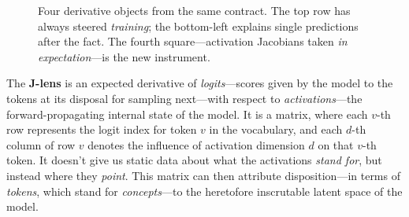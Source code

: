 \documentclass{article}
\newcommand{\logits}{\mathrm{logits}}
\begin{document}
\begin{figure}[htbp]
\centering
{}
\caption{Four derivative objects from the same contract. The top row has always steered \emph{training}; the bottom-left explains single predictions after the fact. The fourth square---activation Jacobians taken \emph{in expectation}---is the new instrument.}
\label{fig:four-square}
\end{figure}


The \textbf{J-lens} is an expected derivative of \textit{logits}---scores given by the model to the tokens at its disposal for sampling next---with respect to \textit{activations}---the forward-propagating internal state of the model. It is a matrix, where each \(v\)-th row represents the logit index for token \(v\) in the vocabulary, and each \(d\)-th column of row \(v\) denotes the influence of activation dimension \(d\) on that \(v\)-th token. It doesn't give us static data about what the activations \textit{stand for}, but instead where they \textit{point}. This matrix can then attribute disposition---in terms of \textit{tokens}, which stand for \textit{concepts}---to the heretofore inscrutable latent space of the model. 
\end{document}
